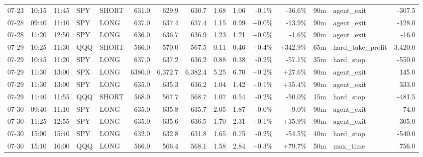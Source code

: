 \documentclass[11pt,a4paper,twoside]{article}
\begin{document}
\begin{landscape}
\begin{center}
\begin{longtable}{>{\color{txtmain}}l l l l l r r r r r r r r >{\color{txtmain}}l r}
07-23 & 10:15 & 11:45 & SPY & SHORT & 631.0 & 629.9 & 630.7 & 1.68 & 1.06 & \textcolor{lossred}{-0.1\%} & \textcolor{lossred}{-36.6\%} & 90m & agent\_exit & \textcolor{lossred}{-307.5} \\
07-28 & 09:40 & 11:10 & SPY & LONG & 637.0 & 637.4 & 637.4 & 1.15 & 0.99 & \textcolor{wingreen}{+0.0\%} & \textcolor{lossred}{-13.9\%} & 90m & agent\_exit & \textcolor{lossred}{-128.0} \\
07-28 & 11:20 & 12:50 & SPY & LONG & 636.0 & 636.7 & 636.9 & 1.23 & 1.21 & \textcolor{wingreen}{+0.0\%} & \textcolor{lossred}{-1.6\%} & 90m & agent\_exit & \textcolor{lossred}{-16.0} \\
07-29 & 10:25 & 11:30 & QQQ & SHORT & 566.0 & 570.0 & 567.5 & 0.11 & 0.46 & \textcolor{wingreen}{+0.4\%} & \textcolor{wingreen}{+342.9\%} & 65m & hard\_take\_profit & \textcolor{wingreen}{3,420.0} \\
07-29 & 10:45 & 11:20 & SPY & LONG & 637.0 & 637.2 & 636.2 & 0.88 & 0.38 & \textcolor{lossred}{-0.2\%} & \textcolor{lossred}{-57.1\%} & 35m & hard\_stop & \textcolor{lossred}{-550.0} \\
07-29 & 11:30 & 13:00 & SPX & LONG & 6380.0 & 6,372.7 & 6,382.4 & 5.25 & 6.70 & \textcolor{wingreen}{+0.2\%} & \textcolor{wingreen}{+27.6\%} & 90m & agent\_exit & \textcolor{wingreen}{145.0} \\
07-29 & 11:30 & 13:00 & SPY & LONG & 635.0 & 635.3 & 636.2 & 1.04 & 1.42 & \textcolor{wingreen}{+0.1\%} & \textcolor{wingreen}{+35.4\%} & 90m & agent\_exit & \textcolor{wingreen}{333.0} \\
07-29 & 11:40 & 11:55 & QQQ & SHORT & 568.0 & 567.7 & 568.7 & 1.07 & 0.54 & \textcolor{lossred}{-0.2\%} & \textcolor{lossred}{-50.0\%} & 15m & hard\_stop & \textcolor{lossred}{-481.5} \\
07-30 & 09:40 & 11:10 & SPY & LONG & 635.0 & 635.8 & 635.7 & 2.05 & 1.87 & \textcolor{lossred}{-0.0\%} & \textcolor{lossred}{-9.0\%} & 90m & agent\_exit & \textcolor{lossred}{-74.0} \\
07-30 & 11:25 & 12:55 & SPY & LONG & 635.0 & 635.6 & 636.5 & 1.70 & 2.31 & \textcolor{wingreen}{+0.1\%} & \textcolor{wingreen}{+35.9\%} & 90m & agent\_exit & \textcolor{wingreen}{305.0} \\
07-30 & 15:00 & 15:40 & SPY & LONG & 632.0 & 632.8 & 631.8 & 1.65 & 0.75 & \textcolor{lossred}{-0.2\%} & \textcolor{lossred}{-54.5\%} & 40m & hard\_stop & \textcolor{lossred}{-540.0} \\
07-30 & 15:10 & 16:00 & QQQ & LONG & 566.0 & 566.4 & 568.1 & 1.58 & 2.84 & \textcolor{wingreen}{+0.3\%} & \textcolor{wingreen}{+79.7\%} & 50m & max\_time & \textcolor{wingreen}{756.0} \\

\end{longtable}
\end{center}
\end{landscape}
\end{document}
